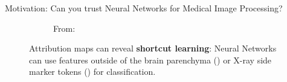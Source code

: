 \documentclass[aspectratio=169,xcolor={table, dvipsnames}]{beamer}
\renewcommand{\emph}[1]{\textbf{#1}}
\begin{document}
\begin{frame}[plain]{Motivation: Can you trust Neural Networks for Medical Image Processing?}
\begin{figure}
\begin{subfigure}[b]{0.7\textwidth}
			\caption{From: \citeauthor{zech_variable_2018}~\cite{zech_variable_2018}}\label{fig:zech}
		\end{subfigure}
		\caption*{Attribution maps can reveal \emph{shortcut learning}:  Neural Networks can use features outside of the brain parenchyma () or X-ray side marker tokens () for classification.}
	\end{figure}

\end{frame}
\end{document}
